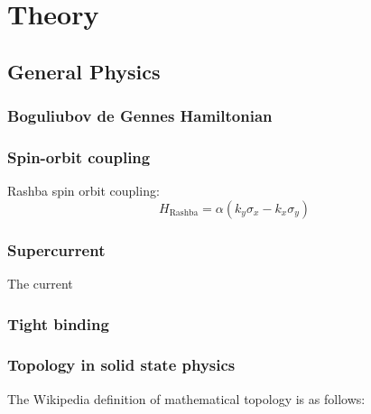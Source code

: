 % 

\newcommand{\kx}{k_x}
\newcommand{\ky}{k_y}

\newcommand{\sigx}{\sigma_x}
\newcommand{\sigy}{\sigma_y}
\newcommand{\sigz}{\sigma_z}
\newcommand{\sigi}{\sigma_0}
\newcommand{\taux}{\tau_x}
\newcommand{\tauy}{\tau_y}
\newcommand{\tauz}{\tau_z}
\newcommand{\taui}{\tau_0}
\chapter{Theory}


\section{General Physics}
	\subsection{Boguliubov de Gennes Hamiltonian}

    \subsection{Spin-orbit coupling}
    Rashba spin orbit coupling:
    \begin{equation}
    	H_\text{Rashba} = \alpha (\ky \sigx - \kx \sigy) 
    \end{equation}

    \subsection{Supercurrent}
	The current 	

	\subsection{Tight binding}

		\subsection{Topology in solid state physics}
		The Wikipedia definition of mathematical topology is as follows:
		
		\cite{noauthor_topology_2018}

